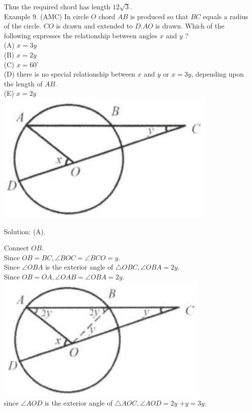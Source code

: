 \documentclass[10pt]{article}
\begin{document}
Thus the required chord has length \(12 \sqrt{3}\).\\
Example 9. (AMC) In circle \(O\) chord \(A B\) is produced so that \(B C\) equals a radius of the circle. \(C O\) is drawn and extended to \(D . A O\) is drawn. Which of the following expresses the relationship between angles \(x\) and \(y\) ?\\
(A) \(x=3 y\)\\
(B) \(x=2 y\)\\
(C) \(x=60^{\circ}\)\\
(D) there is no special relationship between \(x\) and \(y\) or \(x=3 y\), depending upon the length of \(A B\).\\
(E) \(x=2 y\)\\
\includegraphics[max width=\textwidth, center]{2025_04_17_97bc1f7e44d93c271a88g-150(2)}

Solution: (A).


Connect \(O B\).\\
Since \(O B=B C, \angle B O C=\angle B C O=y\).\\
Since \(\angle O B A\) is the exterior angle of \(\triangle O B C, \angle O B A=2 y\).\\
Since \(O B=O A, \angle O A B=\angle O B A=2 y\).\\
\includegraphics[max width=\textwidth, center]{2025_04_17_97bc1f7e44d93c271a88g-151(2)}\\
since \(\angle A O D\) is the exterior angle of \(\triangle A O C, \angle A O D=2 y\) \(+y=3 y\).
\end{document}
